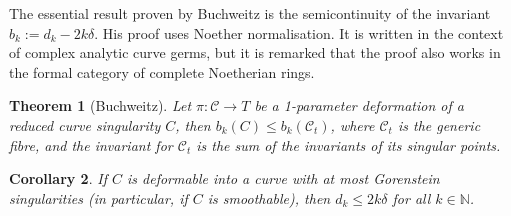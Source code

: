 \documentclass{amsart}
\newcommand{\N}{\mathbb{N}}
\newtheorem{thm}{Theorem}[section]
\newtheorem{cor}[thm]{Corollary}
\theoremstyle{definition}
\theoremstyle{remark}
\begin{document}

The essential result proven by Buchweitz is the semicontinuity of the invariant
$b_k:=d_k-2k\delta$. His proof uses Noether normalisation. It is written 
in the context of complex analytic curve germs, but it is remarked that the proof
also works in the formal category of complete Noetherian rings.

\begin{thm}[Buchweitz]
Let $\pi \colon \mathcal C \to T$ be a 1-parameter deformation of a reduced 
curve singularity $C$, then 
$b_k(C) \leq b_k(\mathcal C_t)$,
where $\mathcal C_t$ is the generic fibre, and the invariant for $\mathcal C_t$ is the
sum of the invariants of its singular points.
\end{thm}


\begin{cor}\label{cor:rb-crit}
If $C$ is deformable into a curve with at most Gorenstein singularities (in particular,
if $C$ is smoothable), then $d_k\leq 2k\delta$ for all $k\in \N$.
\end{cor}
\end{document}
